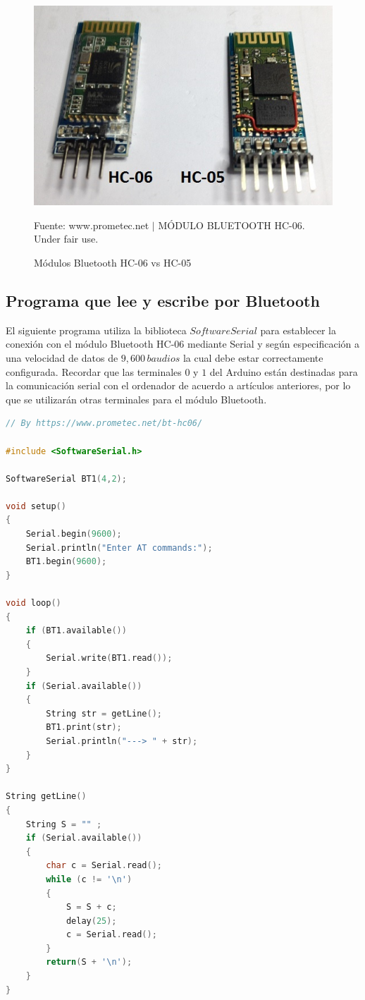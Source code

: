 \documentclass[conference]{IEEEtran}
\begin{document}
\begin{figure}[H]
\centering
\includegraphics[width=0.3\paperwidth]{images/bt-hc-06-vs-hc-05}
\caption{Módulos Bluetooth HC-06 vs HC-05}
\footnotesize
Fuente: www.prometec.net $\mid$ MÓDULO BLUETOOTH HC-06. Under fair use. \cite{prometecnet-2019}
\end{figure}

\subsection{Programa que lee y escribe por Bluetooth}

El siguiente programa utiliza la biblioteca $SoftwareSerial$ para establecer la conexión con el módulo Bluetooth HC-06 mediante Serial y según especificación a una velocidad de datos de $9,600 \, baudios$ la cual debe estar correctamente configurada. Recordar que las terminales $0$ y $1$ del Arduino están destinadas para la comunicación serial con el ordenador de acuerdo a artículos anteriores, por lo que se utilizarán otras terminales para el módulo Bluetooth.

\begin{lstlisting}[language=C, caption=Programa que lee y escribe por Bluetooth. Fuente: www.prometec.net $\mid$ MÓDULO BLUETOOTH HC-06. Under fair use. \cite{prometecnet-2019}]
// By https://www.prometec.net/bt-hc06/

#include <SoftwareSerial.h>

SoftwareSerial BT1(4,2);

void setup()
{
    Serial.begin(9600);
    Serial.println("Enter AT commands:");
    BT1.begin(9600);
}

void loop()
{
    if (BT1.available())
    {
        Serial.write(BT1.read());
    }
    if (Serial.available())
    {
        String str = getLine();
        BT1.print(str);
        Serial.println("---> " + str);
    }
}

String getLine()
{
    String S = "" ;
    if (Serial.available())
    {
        char c = Serial.read();
        while (c != '\n')
        {
            S = S + c;
            delay(25);
            c = Serial.read();
        }
        return(S + '\n');
    }
}
\end{lstlisting}
\end{document}
